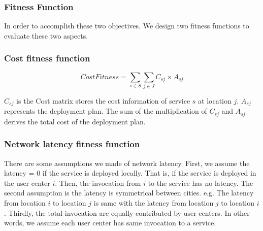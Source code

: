 \documentclass{llncs}
\begin{document}
\subsubsection{Fitness Function}

\begin{flushleft}In order to accomplish these two objectives. We design two fitness functions to evaluate these two aspects.\end{flushleft}
\subsubsection{Cost fitness function}
\begin{center}
	\begin{equation}
		CostFitness = \sum\limits_{s \in S} \sum\limits_{j \in J} C_{sj} \times A_{sj}
	\end{equation}
\end{center}

$C_{sj}$ is the Cost matrix stores the cost information of service $s$ at location $j$. $A_{sj}$ represents the deployment plan. The sum of the multiplication of 
$C_{sj}$ and $A_{sj}$ derives the total cost of the deployment plan.

\subsubsection{Network latency fitness function}

There are some assumptions we made of network latency. First, we assume
the latency = 0 if the service is deployed locally. That is, if the service is deployed in the user center $i$. Then, the 
invocation from $i$ to the service has no latency. The second assumption is the latency is symmetrical between cities. e.g. 
The latency from location $i$ to location $j$ is same with the latency from location $j$ to location $i$. Thirdly, the total invocation are equally
contributed by user centers. In other words, we assume each user center has same invocation to a service.
\end{document}
